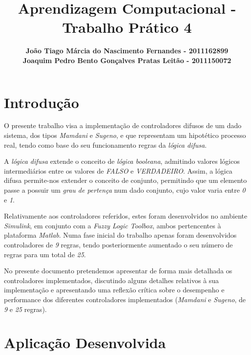 \documentclass{article}
\title{\bf{Aprendizagem Computacional - Trabalho Prático 4}\vspace{80mm}}
\author{\textbf{João Tiago Márcia do Nascimento Fernandes - 2011162899} \\
\textbf{Joaquim Pedro Bento Gonçalves Pratas Leitão - 2011150072}}
\begin{document}
\maketitle

\pagebreak

\renewcommand*\contentsname{Índice}
\tableofcontents

\pagebreak

\section{Introdução}

O presente trabalho visa a implementação de controladores difusos de um dado sistema, dos tipos \emph{Mamdani} e \emph{Sugeno}, e que representam um hipotético processo real, tendo como base do seu funcionamento regras da \emph{lógica difusa}.

\vspace{.3cm}

A \emph{lógica difusa} extende o conceito de \emph{lógica booleana}, admitindo valores lógicos intermediários entre os valores de \emph{FALSO} e \emph{VERDADEIRO}. Assim, a lógica difusa permite-nos extender o conceito de conjunto, permitindo que um elemento passe a possuir um \emph{grau de pertença} num dado conjunto, cujo valor varia entre \emph{0} e \emph{1}.

\vspace{.3cm}

Relativamente aos controladores referidos, estes foram desenvolvidos no ambiente \emph{Simulink}, em conjunto com a \emph{Fuzzy Logic Toolbox}, ambos pertencentes à plataforma \emph{Matlab}. Numa fase inicial do trabalho apenas foram desenvolvidos controladores de \emph{9} regras, tendo posteriormente aumentado o seu número de regras para um total de \emph{25}.

\vspace{.3cm}

No presente documento pretendemos apresentar de forma mais detalhada os controladores implementados, discutindo alguns detalhes relativos à sua implementação e apresentando uma reflexão crítica sobre o desempenho e performance dos diferentes controladores implementados (\emph{Mamdani} e \emph{Sugeno}, de \emph{9} e \emph{25} regras).


\pagebreak

\section{Aplicação Desenvolvida}
\end{document}
